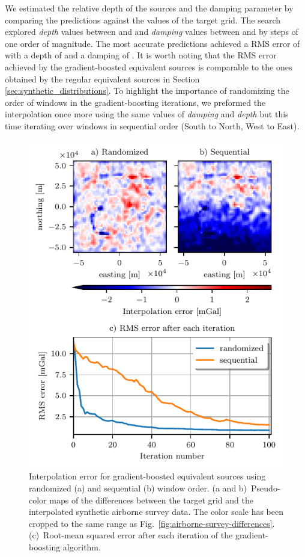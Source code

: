 We estimated the relative depth of the sources and the damping parameter by
comparing the predictions against the values of the target grid.
The search explored \emph{depth} values between \EqlBoostAirborneMinDepth{} and
\EqlBoostAirborneMaxDepth{} and \emph{damping} values between
\EqlBoostAirborneMinDamping{} and \EqlBoostAirborneMaxDamping{} by steps of one
order of magnitude.
The most accurate predictions achieved a RMS error of
\EqlBoostAirborneRmsScore{} with a depth of \EqlBoostAirborneDepth{} and
a damping of \EqlBoostAirborneDamping{}.
It is worth noting that the RMS error achieved by the gradient-boosted
equivalent sources is comparable to the ones obtained by the regular equivalent
sources in Section \ref{sec:synthetic_distributions}.
To highlight the importance of randomizing the order of windows in the
gradient-boosting iterations, we preformed the interpolation once more using
the same values of \emph{damping} and \emph{depth} but this time iterating over
windows in sequential order (South to North, West to East).

\begin{figure}[tb]
    \includegraphics[width=\linewidth]{eql-gradient-boosted/figs/eql-boost-airborne.pdf}
    \caption{
        Interpolation error for gradient-boosted equivalent sources using
        randomized (a) and sequential (b) window order.
        (a and b)~Pseudo-color maps of the differences between the target grid
        and the interpolated synthetic airborne survey data.
        The color scale has been cropped to the same range as
        Fig.~\ref{fig:airborne-survey-differences}.
        (c)~Root-mean squared error after each iteration of the
        gradient-boosting algorithm.
}
\label{fig:eql-boost-airborne}
\end{figure}

